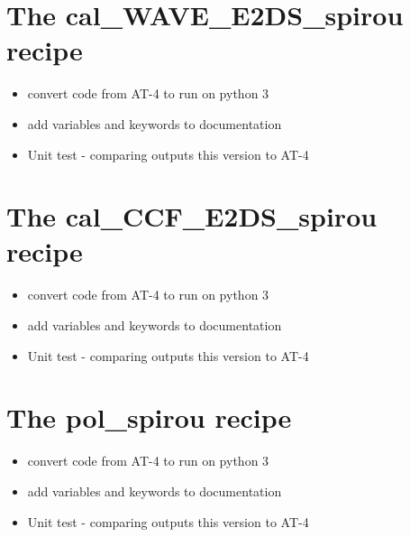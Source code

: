 \section{The cal\_WAVE\_E2DS\_spirou recipe}
\label{ch:todo:cal_WAVE_E2DS_spirou}

\begin{itemize}
	\item convert code from AT-4 to run on python 3
	\item add variables and keywords to documentation
	\item Unit test - comparing outputs this version to AT-4
\end{itemize}


\section{The cal\_CCF\_E2DS\_spirou recipe}
\label{ch:todo:cal_CCF_E2DS_spirou}

\begin{itemize}
	\item convert code from AT-4 to run on python 3
	\item add variables and keywords to documentation
	\item Unit test - comparing outputs this version to AT-4
\end{itemize}


\section{The pol\_spirou recipe}
\label{ch:todo:pol_spirou}

\begin{itemize}
	\item convert code from AT-4 to run on python 3
	\item add variables and keywords to documentation
	\item Unit test - comparing outputs this version to AT-4
\end{itemize}
